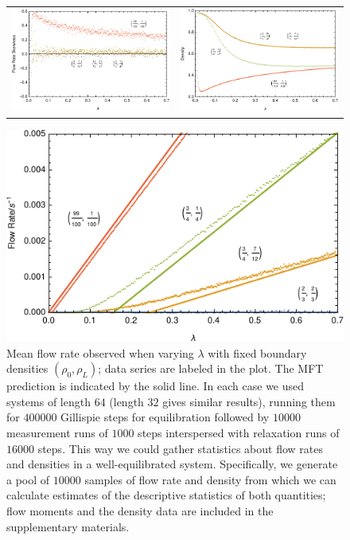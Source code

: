 \begin{figure}[h!]
\begin{center}
\begin{tabular}{c|c}
    \hline
    \includegraphics[width=0.5\linewidth]{../tex-src/images/lambdaScan/newFlowSkew} & \includegraphics[width=0.5\linewidth]{../tex-src/images/lambdaScan/newDens} \\
    \end{tabular}
\end{center}
    \vspace{-0em}
\end{figure}
\fi
\begin{figure}[h!]
\vspace{1em}
\caption{\label{fig:lambdaScans} Mean flow rate observed when varying $\lambda$ with fixed boundary densities $(\rho_0, \rho_L)$; data series are labeled in the plot.
The MFT prediction is indicated by the solid line.
In each case we used systems of length $64$ (length $32$ gives similar results),
running them for $400000$ Gillispie steps for equilibration followed by $10000$ measurement runs of $1000$ steps interspersed with relaxation runs of $16000$
steps. This way we could gather statistics about flow rates and densities in a well-equilibrated system. Specifically, we generate a pool of $10000$ samples of flow rate and density
from which we can calculate estimates of the descriptive statistics of both quantities; flow moments and the density data are included in the supplementary materials.
\vspace{1em}}
\includegraphics[width=0.98\linewidth]{../tex-src/images/lambdaScan/newFlowMean}
    \vspace{-1em}
\end{figure}

